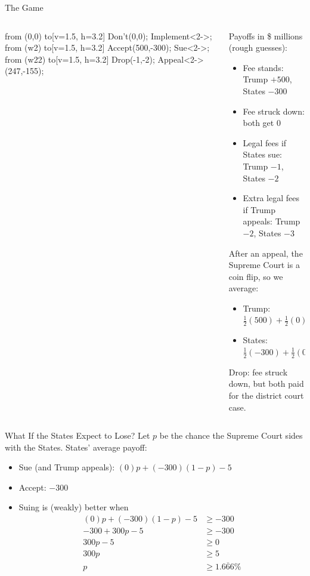 \begin{frame}{The Game}
\begin{columns}[c]
\begin{column}{0.50\textwidth}
\centering
\begin{gametree}[player names={Trump, States}, scale=0.72]
  \branch[player=1, root=w, label=90] from (0,0) to[v=1.5, h=3.2]
    {Don't(0,0); Implement<2->};
  \branch[player=2, label=0] from (w2) to[v=1.5, h=3.2]
    {Accept(500,-300); Sue<2->};
  \branch[player=1, label=0] from (w22) to[v=1.5, h=3.2]
    {Drop(-1,-2); Appeal<2->(247,-155)};
\end{gametree}
\end{column}
\begin{column}{0.48\textwidth}
\footnotesize
Payoffs in \$ millions (rough guesses):
\begin{itemize}
    \item Fee stands: Trump $+500$, States $-300$
    \item Fee struck down: both get $0$
    \item Legal fees if States sue: Trump $-1$, States $-2$
    \item Extra legal fees if Trump appeals: Trump $-2$, States $-3$
\end{itemize}
\medskip
After an appeal, the Supreme Court is a coin flip, so we average:
\begin{itemize}
    \item Trump: $\tfrac12(500) + \tfrac12(0) - 1 - 2 = 247$
    \item States: $\tfrac12(-300) + \tfrac12(0) - 2 - 3 = -155$
\end{itemize}
\medskip
Drop: fee struck down, but both paid for the district court case.
\end{column}
\end{columns}
\vfill
\raggedright
{}%
\vspace{-0.2in}
\end{frame}

\begin{frame}{What If the States Expect to Lose?}
Let $p$ be the chance the Supreme Court sides with the States.
\bsk
States' average payoff:
\begin{itemize}
    \item<2-> Sue (and Trump appeals): $(0)p+(-300)(1-p) - 5$
    \item<2-> Accept: $-300$
    \item<3-> Suing is (weakly) better when 
    \begin{align*}
        (0)p+(-300)(1-p)-5 &\geq -300 \\
        -300 + 300p -5 &\geq -300 \\
        300p - 5 &\geq 0\\
        300p &\geq 5\\
        p &\geq 1.\overline{666}\%
    \end{align*}
\end{itemize}
\end{frame}

